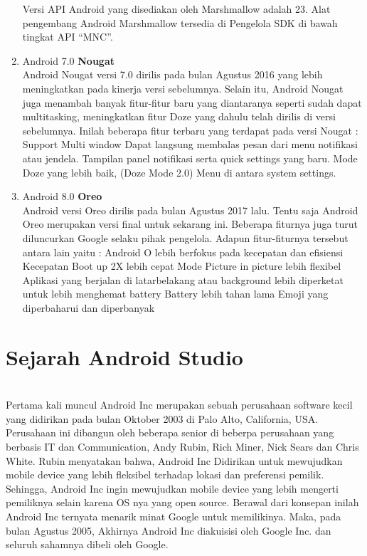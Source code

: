 \begin{enumerate}
Versi API Android yang disediakan oleh Marshmallow adalah 23. Alat pengembang Android Marshmallow tersedia di Pengelola SDK di bawah tingkat API “MNC”.

\item Android 7.0 \textbf{Nougat}\\
Android Nougat versi 7.0 dirilis pada bulan Agustus 2016 yang lebih meningkatkan pada kinerja versi sebelumnya. Selain itu, Android Nougat juga menambah banyak fitur-fitur baru yang diantaranya seperti sudah dapat multitasking, meningkatkan fitur Doze yang dahulu telah dirilis di versi sebelumnya. Inilah beberapa fitur terbaru yang terdapat pada versi Nougat :
Support Multi window
Dapat langsung membalas pesan dari menu notifikasi atau jendela.
Tampilan panel notifikasi serta quick settings yang baru.
Mode Doze yang lebih baik, (Doze Mode 2.0)
Menu di antara system settings.

\item Android 8.0 \textbf{Oreo}\\
Android versi Oreo dirilis pada bulan Agustus 2017 lalu. Tentu saja Android Oreo merupakan versi final untuk sekarang ini. Beberapa fiturnya juga turut diluncurkan Google selaku pihak pengelola. Adapun fitur-fiturnya tersebut antara lain yaitu :
Android O lebih berfokus pada kecepatan dan efisiensi
Kecepatan Boot up 2X lebih cepat
Mode Picture in picture lebih flexibel
Aplikasi yang berjalan di latarbelakang atau background lebih diperketat untuk lebih menghemat battery
Battery lebih tahan lama
Emoji yang diperbaharui dan diperbanyak
\end{enumerate}

\section{Sejarah Android Studio}\\
Pertama kali muncul Android Inc merupakan sebuah perusahaan software kecil yang didirikan pada bulan Oktober 2003 di Palo Alto, California, USA. Perusahaan ini dibangun oleh beberapa senior di beberpa perusahaan yang berbasis IT dan Communication, Andy Rubin, Rich Miner, Nick Sears dan Chris White. Rubin menyatakan bahwa, Android Inc Didirikan untuk mewujudkan mobile device yang lebih fleksibel terhadap lokasi dan preferensi pemilik. Sehingga, Android Inc ingin mewujudkan mobile device yang lebih mengerti pemiliknya selain karena OS nya yang open source. Berawal dari konsepan inilah Android Inc ternyata menarik minat Google untuk memilikinya. Maka, pada bulan Agustus 2005, Akhirnya Android Inc diakuisisi oleh Google Inc. dan seluruh sahamnya dibeli oleh Google.

